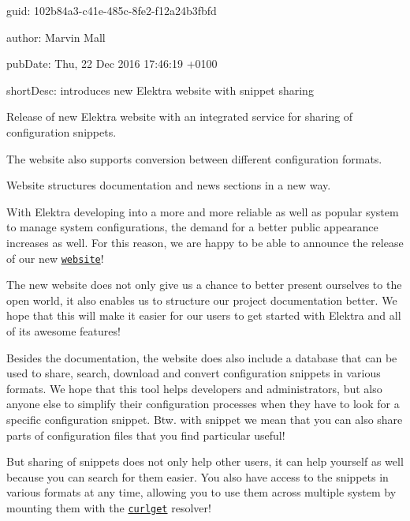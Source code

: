 
\begin{DoxyItemize}
\item guid\+: 102b84a3-\/c41e-\/485c-\/8fe2-\/f12a24b3fbfd
\item author\+: Marvin Mall
\item pub\+Date\+: Thu, 22 Dec 2016 17\+:46\+:19 +0100
\item short\+Desc\+: introduces new Elektra website with snippet sharing
\end{DoxyItemize}


\begin{DoxyEnumerate}
\item Release of new Elektra website with an integrated service for sharing of configuration snippets.
\item The website also supports conversion between different configuration formats.
\item Website structures documentation and news sections in a new way.
\end{DoxyEnumerate}

With Elektra developing into a more and more reliable as well as popular system to manage system configurations, the demand for a better public appearance increases as well. For this reason, we are happy to be able to announce the release of our new \href{https://www.libelektra.org}{\tt website}!

The new website does not only give us a chance to better present ourselves to the open world, it also enables us to structure our project documentation better. We hope that this will make it easier for our users to get started with Elektra and all of its awesome features!

Besides the documentation, the website does also include a database that can be used to share, search, download and convert configuration snippets in various formats. We hope that this tool helps developers and administrators, but also anyone else to simplify their configuration processes when they have to look for a specific configuration snippet. Btw. with snippet we mean that you can also share parts of configuration files that you find particular useful!

But sharing of snippets does not only help other users, it can help yourself as well because you can search for them easier. You also have access to the snippets in various formats at any time, allowing you to use them across multiple system by mounting them with the \href{https://master.libelektra.org/src/plugins/curlget}{\tt curlget} resolver!

